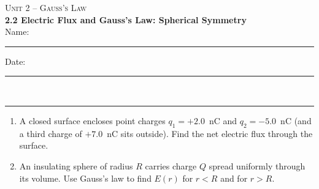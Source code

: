 \documentclass[11pt,letterpaper]{article}
\begin{document}
{\small\textsc{Unit 2 -- Gauss's Law}}\\[2pt]{\Large\bfseries 2.2 Electric Flux and Gauss's Law: Spherical Symmetry}\\[8pt]Name: \rule{2.4in}{0.4pt} \hfill Date: \rule{1.4in}{0.4pt}\\[4pt]\hrule\vspace{10pt}{\small\itshape Placeholder worksheet for the site prototype. Free for classroom use.}\vspace{6pt}
\begin{enumerate}[leftmargin=*,itemsep=10pt]
\item A closed surface encloses point charges $q_1 = +2.0$~nC and $q_2 = -5.0$~nC (and a third charge of $+7.0$~nC sits outside). Find the net electric flux through the surface.
\vspace{2.2in}
\item An insulating sphere of radius $R$ carries charge $Q$ spread uniformly through its volume. Use Gauss's law to find $E(r)$ for $r<R$ and for $r>R$.
\vspace{2.2in}
\end{enumerate}
\end{document}
